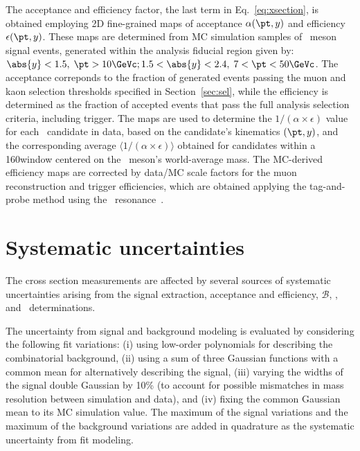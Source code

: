 The acceptance and efficiency factor, the last term in Eq.~\ref{eq:xsection}, is obtained employing 2D fine-grained maps of acceptance $\alpha (\pt,y)$ and efficiency $\epsilon(\pt,y)$.
These maps are determined from MC simulation samples of \PB\ meson signal events, generated within the analysis fiducial region given by: $\abs{y}<1.5, \; \pt>10\GeVc; 1.5<\abs{y}<2.4, \; 7<\pt<50\GeVc$.
%
The acceptance correponds to the fraction of generated events passing the muon and kaon selection thresholds specified in Section~\ref{sec:sel}, while the efficiency is determined as the fraction of accepted events that pass the full analysis selection criteria, including trigger.
%
The maps are used to determine the $1/(\alpha\times\epsilon)$ value for each \PB\ candidate in data, based on the candidate's kinematics $(\pt,y)$, and the corresponding average $\langle 1/(\alpha\times \epsilon)\rangle$ obtained for candidates within a 160\GeVcc window centered on the \PB\ meson's world-average mass. 
The MC-derived efficiency maps are corrected by data/MC scale factors for the muon reconstruction and trigger efficiencies, which are obtained applying the tag-and-probe method using the \PJGy\ resonance~\cite{Khachatryan:2010zg}.
%


\section{Systematic uncertainties}

The cross section measurements are affected by several sources of systematic uncertainties arising from the signal extraction, acceptance and efficiency, $\mathcal{B}$, \NMB, and \TAA\ determinations.

The uncertainty from signal and background modeling is evaluated by considering the following fit variations:
(i) using low-order polynomials for describing the combinatorial background, 
(ii) using a sum of three Gaussian functions with a common mean for alternatively describing the signal,
(iii) varying the widths of the signal double Gaussian by 10\% (to account for possible mismatches in mass resolution between simulation and data), and
(iv) fixing the common Gaussian mean to its MC simulation value. 
The maximum of the signal variations and the maximum of the background variations are added in quadrature as the systematic uncertainty from fit modeling.

